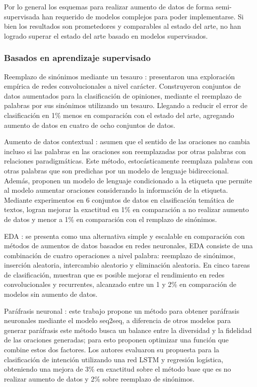 Por lo general los esquemas para realizar aumento de datos de forma semi-supervisada han requerido de modelos complejos para poder implementarse. Si bien los resultados son prometedores y comparables al estado del arte, no han logrado superar el estado del arte basado en modelos supervisados.

\subsubsection{Basados en aprendizaje supervisado}

Reemplazo de sinónimos mediante un tesauro \citep{zhang2015character}: presentaron una exploración empírica de redes convolucionales a nivel carácter. Construyeron conjuntos de datos aumentados para la clasificación de opiniones, mediante el reemplazo de palabras por sus sinónimos utilizando un tesauro. Llegando a reducir el error de clasificación en 1\% menos en comparación con el estado del arte, agregando aumento de datos en cuatro de ocho conjuntos de datos.

Aumento de datos contextual \citep{kobayashi2018contextual}: asumen que el sentido de las oraciones no cambia incluso si las palabras en las oraciones son reemplazadas por otras palabras con relaciones paradigmáticas. Este método, estocásticamente reemplaza palabras con otras palabras que son predichas por un modelo de lenguaje bidireccional. Además, proponen un modelo de lenguaje condicionado a la etiqueta que permite al modelo aumentar oraciones considerando la información de la etiqueta. Mediante experimentos en 6 conjuntos de datos en clasificación temática de textos, logran mejorar la exactitud en 1\% en comparación a no realizar aumento de datos y menor a 1\% en comparación con el remplazo de sinónimos.

EDA \citep{wei2019eda}: se presenta como una alternativa simple y escalable en comparación con métodos de aumentos de datos basados en redes neuronales, EDA consiste de una combinación de cuatro operaciones a nivel palabra: reemplazo de sinónimos, inserción aleatoria, intercambio aleatorio y eliminación aleatoria. En cinco tareas de clasificación, muestran que es posible mejorar  el rendimiento en redes convolucionales y recurrentes, alcanzado entre un 1 y 2\% en comparación de modelos sin aumento de datos.

Paráfrasis neuronal \citep{kumar2019submodular}: este trabajo propone un método para obtener paráfrasis neuronales mediante el modelo seq2seq, a diferencia de otros modelos para generar paráfrasis este método busca un balance entre la diversidad y la fidelidad de las oraciones generadas; para esto proponen optimizar una función que combine estos dos factores. Los autores evaluaron su propuesta para la clasificación de intención utilizando una red LSTM y regresión logística, obteniendo una mejora de 3\% en exactitud sobre el método base que es no realizar aumento de datos y 2\% sobre reemplazo de sinónimos.

